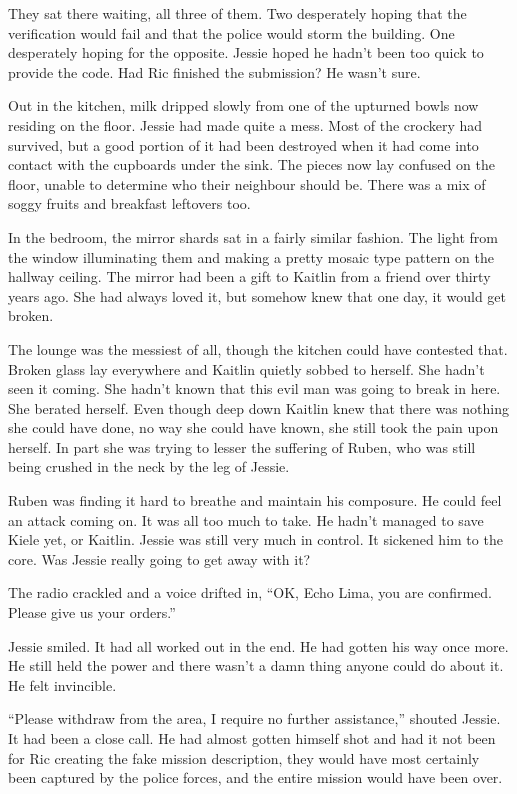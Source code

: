 They sat there waiting, all three of them.  Two desperately hoping that the verification would fail and that the police would storm the building.  One desperately hoping for the opposite.  Jessie hoped he hadn't been too quick to provide the code.  Had Ric finished the submission?  He wasn't sure.

Out in the kitchen, milk dripped slowly from one of the upturned bowls now residing on the floor.  Jessie had made quite a mess.  Most of the crockery had survived, but a good portion of it had been destroyed when it had come into contact with the cupboards under the sink.  The pieces now lay confused on the floor, unable to determine who their neighbour should be.  There was a mix of soggy fruits and breakfast leftovers too.  

In the bedroom, the mirror shards sat in a fairly similar fashion.  The light from the window illuminating them and making a pretty mosaic type pattern on the hallway ceiling.  The mirror had been a gift to Kaitlin from a friend over thirty years ago.  She had always loved it, but somehow knew that one day, it would get broken.

The lounge was the messiest of all, though the kitchen could have contested that.  Broken glass lay everywhere and Kaitlin quietly sobbed to herself.  She hadn't seen it coming.  She hadn't known that this evil man was going to break in here.  She berated herself.  Even though deep down Kaitlin knew that there was nothing she could have done, no way she could have known, she still took the pain upon herself.  In part she was trying to lesser the suffering of Ruben, who was still being crushed in the neck by the leg of Jessie.

Ruben was finding it hard to breathe and maintain his composure.  He could feel an attack coming on.  It was all too much to take.  He hadn't managed to save Kiele yet, or Kaitlin.  Jessie was still very much in control.  It sickened him to the core.  Was Jessie really going to get away with it?

The radio crackled and a voice drifted in, ``OK, Echo Lima, you are confirmed.  Please give us your orders.''

Jessie smiled.  It had all worked out in the end.  He had gotten his way once more.  He still held the power and there wasn't a damn thing anyone could do about it.  He felt invincible.  

``Please withdraw from the area, I require no further assistance,'' shouted Jessie.  It had been a close call.  He had almost gotten himself shot and had it not been for Ric creating the fake mission description, they would have most certainly been captured by the police forces, and the entire mission would have been over.

